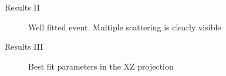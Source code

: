 \documentclass[8pt]{beamer}
\begin{document}
\begin{frame}{Results II}
\begin{figure}[h!]
    \centering
    \caption{Well fitted event. Multiple scattering is clearly visible}
    \label{fig:well}
\end{figure}
    
\end{frame}


\begin{frame}{Results III}

\vspace{-0.18cm}
\begin{figure}[h!]
    \centering
    \caption{Best fit parameters in the XZ projection}
    \label{fig:well}
\end{figure}



    
\end{frame}
\end{document}
